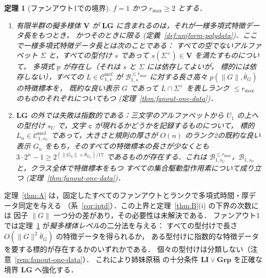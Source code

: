 \documentclass[11pt,a4paper]{ltjsarticle}
\numberwithin{equation}{section}
\theoremstyle{plain}
\theoremstyle{definition}
\theoremstyle{remark}
\newcommand{\Cmcf}[2]{\mathcal{C}^{\mathrm{mcf}}_{#1,#2}}
\theoremstyle{plain}
\newtheorem{mainthm}{定理}
\begin{document}
\begin{mainthm}[ファンアウト1での境界]
\label{thm:C}
$f=1$ かつ $r_{\max}\ge2$ とする．
\begin{enumerate}[label=\textup{(\roman*)},leftmargin=*]
\item 有限半群の擬多様体 $\mathbf V$ が
$\mathbf{LG}$ に含まれるのは，それが\emph{一様多項式特徴データ長}をもつとき，
かつそのときに限る \textup(定義~\ref{def:uniform-polydata}\textup)．ここで一様多項式特徴データ長とは次のことである：
すべての空でないアルファベット $\Sigma$ と，すべての型付け $s$ であって $s(\Sigma^+)\in\mathbf V$ を満たすものについて，
多項式 $p$ が存在し（それは $s$ と $\Sigma$ には依存してよいが，
標的には依存しない），すべての $L\in\Cmcf{1}{s}$ が
$\mathcal B^{\le r_{\max}}_{1,s}$ に対する長さ高々 $p(\|G\|,\bar\theta_G)$ の特徴標本を，
既約な良い表示 $G$ であって $L\cap\Sigma^+$ を表しランク $\le r_{\max}$ のもののそれぞれについてもつ
\textup(定理~\ref{thm:fanout-one-data}\textup)．
\item $\mathbf{LG}$ の外では失敗は指数的である：三文字のアルファベットから
$U_1$ の上への型付け $s_U$ で，文字 $\mathtt c$ が現れるかどうかを記録するものについて，
標的 $L_n\in\Cmcf{1}{s_U}$ であって，大きさと規則の厚さが
$O(n)$ のランク2の既約な良い表示 $G_n$ をもち，そのすべての特徴標本の長さが少なくとも
$3\cdot2^n-1\ge2^{(\|G_n\|+\bar\theta_{G_n})/17}$ であるものが存在する．これは
$\mathcal B^{\le r_{\max}}_{1,s_U}$，$\mathcal B_{1,s_U}$ と，クラス全体で特徴標本をもつ
すべての集合駆動型作用素について成り立つ
\textup(定理~\ref{thm:fanout-one-data}\textup)．
\end{enumerate}
\end{mainthm}

定理~\ref{thm:A} は，固定したすべてのファンアウトとランクで多項式時間・厚データ同定を与える
（系~\ref{cor:iptd}）．この上界と定理~\ref{thm:B}(i) の下界の次数には
因子 $\|G\|$ 一つ分の差があり，その必要性は未解決である．
ファンアウト1では定理~\ref{thm:C} が\emph{擬多様体レベル}の二分法を与える：
すべての型付けで長さ $O(\|G\|^2\bar\theta_G)$ の特徴データを得られるか，
ある型付けに指数的な特徴データを要する標的が存在するかのいずれかである．
個々の型付けは分類しない（注意~\ref{rem:fanout-one-data}）．
これにより姉妹原稿 \cite{kuriyamaCFG} の十分条件
$\mathbf{LI}\vee\mathbf{Grp}$ を正確な境界 $\mathbf{LG}$ へ強化する．
\end{document}
